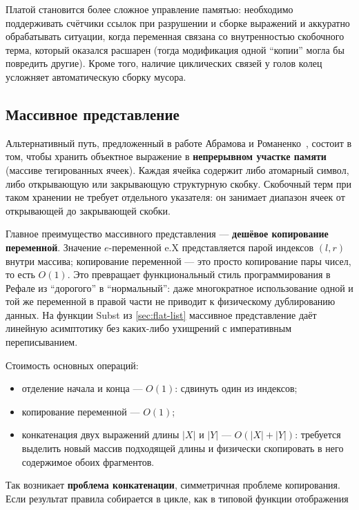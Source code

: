 \documentclass[14pt, russian]{scrartcl}
\renewcommand{\emph}[1]{#1}
\newcommand{\enq}[1]{\enquote{#1}}
\newcommand{\prog}[1]{{\ttfamily\small#1}}
\begin{document}
Платой становится более сложное управление памятью: необходимо
поддерживать счётчики ссылок при разрушении и сборке выражений и аккуратно
обрабатывать ситуации, когда переменная связана со \emph{внутренностью}
скобочного терма, который оказался расшарен (тогда модификация одной
\enq{копии} могла бы повредить другие). Кроме того, наличие циклических
связей у голов колец усложняет автоматическую сборку мусора.

\subsection{Массивное представление}
\label{sec:array-repr}

Альтернативный путь, предложенный в работе Абрамова и
Романенко~\cite{abramov_romanenko_1988}, состоит в том, чтобы хранить
объектное выражение в \textbf{непрерывном участке памяти} (массиве
тегированных ячеек). Каждая ячейка содержит либо атомарный символ, либо
открывающую или закрывающую структурную скобку. Скобочный терм при таком
хранении не требует отдельного указателя: он занимает диапазон ячеек от
открывающей до закрывающей скобки.

Главное преимущество массивного представления --- \textbf{дешёвое копирование
переменной}. Значение \(e\)-переменной \prog{e.X} представляется парой
индексов \((l, r)\) внутри массива; копирование переменной --- это просто
копирование пары чисел, то есть \(O(1)\). Это превращает функциональный
стиль программирования в Рефале из \enq{дорогого} в \enq{нормальный}: даже
многократное использование одной и той же переменной в правой части не
приводит к физическому дублированию данных. На функции \prog{Subst} из
\ref{sec:flat-list} массивное представление даёт линейную асимптотику без
каких-либо ухищрений с императивным переписыванием.

Стоимость основных операций:

\begin{itemize}
  \item отделение начала и конца --- \(O(1)\): сдвинуть один из индексов;
  \item копирование переменной --- \(O(1)\);
  \item конкатенация двух выражений длины \(|X|\) и \(|Y|\) ---
        \(O(|X| + |Y|)\): требуется выделить новый массив подходящей
        длины и физически скопировать в него содержимое обоих фрагментов.
\end{itemize}

Так возникает \textbf{проблема конкатенации}, симметричная проблеме
копирования. Если результат правила собирается в цикле, как в типовой
функции отображения
\end{document}

